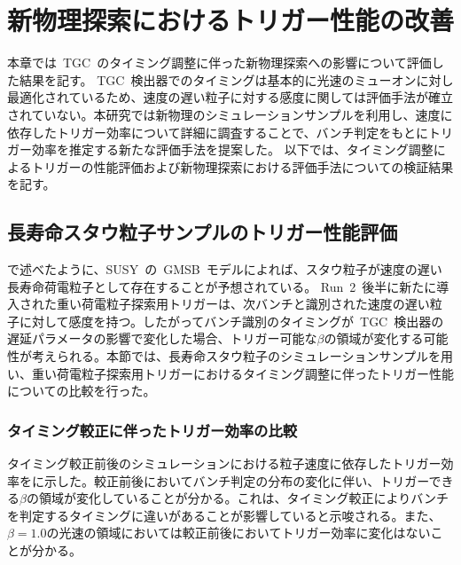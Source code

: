 \chapter{新物理探索におけるトリガー性能の改善}
\thispagestyle{empty}
\label{chap:6}
本章では~TGC~のタイミング調整に伴った新物理探索への影響について評価した結果を記す。
TGC~検出器でのタイミングは基本的に光速のミューオンに対し最適化されているため、速度の遅い粒子に対する感度に関しては評価手法が確立されていない。本研究では新物理のシミュレーションサンプルを利用し、速度に依存したトリガー効率について詳細に調査することで、バンチ判定をもとにトリガー効率を推定する新たな評価手法を提案した。
以下では、タイミング調整によるトリガーの性能評価および新物理探索における評価手法についての検証結果を記す。

\section{長寿命スタウ粒子サンプルのトリガー性能評価}
で述べたように、SUSY~の~GMSB~モデルによれば、スタウ粒子が速度の遅い長寿命荷電粒子として存在することが予想されている。
Run~2~後半に新たに導入された重い荷電粒子探索用トリガーは、次バンチと識別された速度の遅い粒子に対して感度を持つ。したがってバンチ識別のタイミングが~TGC~検出器の遅延パラメータの影響で変化した場合、トリガー可能な$\beta$の領域が変化する可能性が考えられる。本節では、長寿命スタウ粒子のシミュレーションサンプルを用い、重い荷電粒子探索用トリガーにおけるタイミング調整に伴ったトリガー性能についての比較を行った。
\subsection{タイミング較正に伴ったトリガー効率の比較}\label{sec:tribeta}
タイミング較正前後のシミュレーションにおける粒子速度に依存したトリガー効率をに示した。較正前後においてバンチ判定の分布の変化に伴い、トリガーできる$\beta$の領域が変化していることが分かる。これは、タイミング較正によりバンチを判定するタイミングに違いがあることが影響していると示唆される。また、$\beta=1.0$の光速の領域においては較正前後においてトリガー効率に変化はないことが分かる。

